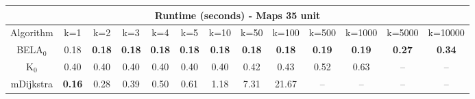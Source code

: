 \begin{tabular}{c|cccccccccccc}\toprule
\multicolumn{13}{c}{Runtime (seconds) - Maps 35 unit}\\ \midrule
Algorithm & k=1 & k=2 & k=3 & k=4 & k=5 & k=10 & k=50 & k=100 & k=500 & k=1000 & k=5000 & k=10000 \\ \midrule
BELA$_0$ & 0.18 & \textbf{0.18} & \textbf{0.18} & \textbf{0.18} & \textbf{0.18} & \textbf{0.18} & \textbf{0.18} & \textbf{0.18} & \textbf{0.19} & \textbf{0.19} & \textbf{0.27} & \textbf{0.34} \\
K$_0$ & 0.40 & 0.40 & 0.40 & 0.40 & 0.40 & 0.40 & 0.42 & 0.43 & 0.52 & 0.63 & -- & -- \\
mDijkstra & \textbf{0.16} & 0.28 & 0.39 & 0.50 & 0.61 & 1.18 & 7.31 & 21.67 & -- & -- & -- & -- \\ \bottomrule 
\end{tabular}
